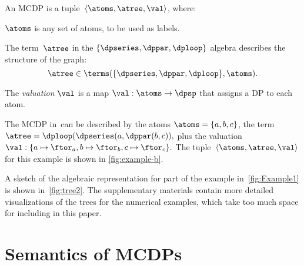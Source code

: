 \begin{definition}
    \label{def:MCDP-algebraic}
    An MCDP is a tuple~$\left\langle \atoms,\atree,\val\right\rangle $,
    where:
    \begin{compactenum}
        \item $\atoms$ is any set of atoms, to be used as labels.
        \item The term~$\atree$ in the $\{\dpseries,\dppar,\dploop\}$ algebra
              describes the structure of the graph:
              \[
                  \atree\in\terms(\{\dpseries,\dppar,\dploop\},\atoms).
              \]
        \item The \emph{valuation} $\val$ is a map $\val:\atoms\rightarrow\dpsp$
              that assigns a DP to each atom.
    \end{compactenum}
\end{definition}
\begin{example}
    The MCDP in~\XXX can be described by the atoms
    $\atoms=\{a,b,c\}$, the term $\atree=\dploop(\dpseries(a,\dppar(b,c)),$
    plus the valuation $\val:\{a\mapsto\ftor_{a},b\mapsto\ftor_{b},c\mapsto\ftor_{c}\}.
    $
    The tuple~$\left\langle \atoms,\atree,\val\right\rangle $ for this
    example is shown in \cref{fig:example-b}.
\end{example}
\begin{example}
    A sketch of the algebraic representation for part of the example in~\cref{fig:Example1}
    is shown in~\cref{fig:tree2}.
    The supplementary materials contain
    more detailed visualizations of the trees for the numerical examples,
    which take too much space for including in this paper.
\end{example}

\section{Semantics of MCDPs}

